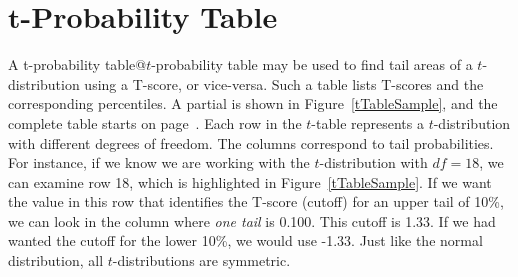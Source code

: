 \section{$\pmb{t}$-Probability Table}
\label{tDistributionTable}

A 
    {t-probability table@$t$-probability table}
may be used to
find tail areas of a $t$-distribution using a T-score,
or vice-versa.
Such a table lists T-scores and the corresponding percentiles.
A partial
is shown in Figure~\ref{tTableSample},
and the complete table starts on page~\pageref{tTableFirstPage}.
Each row in the $t$-table represents a $t$-distribution with
different degrees of freedom.
The columns correspond to tail probabilities.
For instance, if we know we are working with the
$t$-distribution with $df=18$, we can examine row 18,
which is highlighted in Figure~\ref{tTableSample}.
If we want the value in this row that identifies the T-score
(cutoff) for an upper tail of 10\%, we can look in the column
where \emph{one tail} is 0.100.
This cutoff is 1.33.
If we had wanted the cutoff for the lower 10\%, we would
use -1.33.
Just like the normal distribution,
all $t$-distributions are symmetric.

